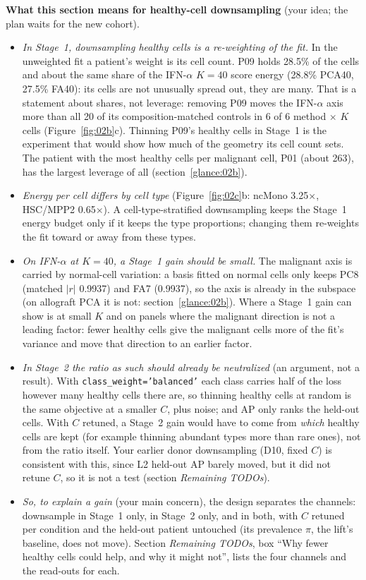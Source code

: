 \textbf{What this section means for healthy-cell downsampling} (your idea; the plan waits for the new cohort).
\begin{itemize}
\item \emph{In Stage~1, downsampling healthy cells is a re-weighting of the fit.} In the unweighted fit a patient's weight is its cell count. P09 holds 28.5\% of the cells and about the same share of the IFN-$\alpha$ $K = 40$ score energy (28.8\% PCA40, 27.5\% FA40): its cells are not unusually spread out, they are many. That is a statement about shares, not leverage: removing P09 moves the IFN-$\alpha$ axis more than all 20 of its composition-matched controls in 6 of 6 method $\times$ $K$ cells (Figure~\ref{fig:02b}c). Thinning P09's healthy cells in Stage~1 is the experiment that would show how much of the geometry its cell count sets. The patient with the most healthy cells per malignant cell, P01 (about 263), has the largest leverage of all (section~\ref{glance:02b}).
\item \emph{Energy per cell differs by cell type} (Figure~\ref{fig:02c}b: ncMono 3.25$\times$, HSC/MPP2 0.65$\times$). A cell-type-stratified downsampling keeps the Stage~1 energy budget only if it keeps the type proportions; changing them re-weights the fit toward or away from these types.
\item \emph{On IFN-$\alpha$ at $K = 40$, a Stage~1 gain should be small.} The malignant axis is carried by normal-cell variation: a basis fitted on normal cells only keeps PC8 (matched $|r|$ 0.9937) and FA7 (0.9937), so the axis is already in the subspace (on allograft PCA it is not: section~\ref{glance:02b}). Where a Stage~1 gain can show is at small $K$ and on panels where the malignant direction is not a leading factor: fewer healthy cells give the malignant cells more of the fit's variance and move that direction to an earlier factor.
\item \emph{In Stage~2 the ratio as such should already be neutralized} (an argument, not a result). With \texttt{class\_weight='balanced'} each class carries half of the loss however many healthy cells there are, so thinning healthy cells at random is the same objective at a smaller $C$, plus noise; and AP only ranks the held-out cells. With $C$ retuned, a Stage~2 gain would have to come from \emph{which} healthy cells are kept (for example thinning abundant types more than rare ones), not from the ratio itself. Your earlier donor downsampling (D10, fixed $C$) is consistent with this, since L2 held-out AP barely moved, but it did not retune $C$, so it is not a test (section \emph{Remaining TODOs}).
\item \emph{So, to explain a gain} (your main concern), the design separates the channels: downsample in Stage~1 only, in Stage~2 only, and in both, with $C$ retuned per condition and the held-out patient untouched (its prevalence $\pi$, the lift's baseline, does not move). Section \emph{Remaining TODOs}, box ``Why fewer healthy cells could help, and why it might not'', lists the four channels and the read-outs for each.
\end{itemize}
